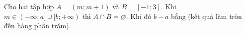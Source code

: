 \begin{ex}
Cho hai tập hợp $A=(m;m+1)$ và $B=[-1;3]$. Khi $m\in(-\infty;a]\cup[b;+\infty)$ thì $A\cap B=\varnothing$. Khi đó $b-a$ bằng (kết quả làm tròn đến hàng phần trăm).
\end{ex}
